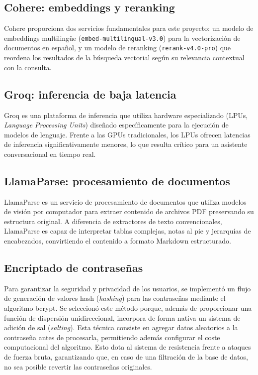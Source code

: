 \documentclass[12pt,a4paper,oneside]{report}
\begin{document}
\subsection*{Cohere: embeddings y reranking}

Cohere \cite{cohere_docs} proporciona dos servicios fundamentales para este proyecto: un modelo de embeddings multilingüe (\texttt{embed-multilingual-v3.0}) para la vectorización de documentos en español, y un modelo de reranking (\texttt{rerank-v4.0-pro}) que reordena los resultados de la búsqueda vectorial según su relevancia contextual con la consulta.

\subsection*{Groq: inferencia de baja latencia}

Groq \cite{groq_docs} es una plataforma de inferencia que utiliza hardware especializado (LPUs, \textit{Language Processing Units}) diseñado específicamente para la ejecución de modelos de lenguaje. Frente a las GPUs tradicionales, los LPUs ofrecen latencias de inferencia significativamente menores, lo que resulta crítico para un asistente conversacional en tiempo real.

\subsection*{LlamaParse: procesamiento de documentos}

LlamaParse \cite{llamaparse_docs} es un servicio de procesamiento de documentos que utiliza modelos de visión por computador para extraer contenido de archivos PDF preservando su estructura original. A diferencia de extractores de texto convencionales, LlamaParse es capaz de interpretar tablas complejas, notas al pie y jerarquías de encabezados, convirtiendo el contenido a formato Markdown estructurado.

\subsection*{Encriptado de contraseñas}

Para garantizar la seguridad y privacidad de los usuarios, se implementó un flujo de generación de valores hash (\textit{hashing}) para las contraseñas mediante el algoritmo bcrypt. Se seleccionó este método porque, además de proporcionar una función de dispersión unidireccional, incorpora de forma nativa un sistema de adición de sal (\textit{salting}). Esta técnica consiste en agregar datos aleatorios a la contraseña antes de procesarla, permitiendo además configurar el coste computacional del algoritmo. Esto dota al sistema de resistencia frente a ataques de fuerza bruta, garantizando que, en caso de una filtración de la base de datos, no sea posible revertir las contraseñas originales.
\end{document}
